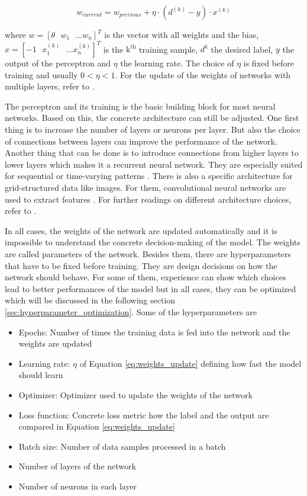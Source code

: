 \begin{equation}
	\label{eq:weights_update}
	w_{current} = w_{previous} + \eta \cdot \left(d^{(k)} - y\right) \cdot x^{(k)}
\end{equation}

where $ w = [\theta \text{ } w_1 \text{ } ... w_n]^T $ is the vector with all weights and the bias, $ x = [-1 \text{ } x_1^{(k)} \text{ } ... x_n^{(k)}]^T $ is the $ \text{k}^{\text{th}} $ training sample, $ d^{k} $ the desired label, $ y $ the output of the perceptron and $ \eta $ the learning rate. The choice of $ \eta $ is fixed before training and usually $ 0 < \eta < 1 $. For the update of the weights of networks with multiple layers, refer to \cite{da2017artificial}. 

The perceptron and its training is the basic building block for most neural networks. Based on this, the concrete architecture can still be adjusted. One first thing is to increase the number of layers or neurons per layer. But also the choice of connections between layers can improve the performance of the network. Another thing that can be done is to introduce connections from higher layers to lower layers which makes it a recurrent neural network. They are especially suited for sequential or time-varying patterns \cite{medsker2001recurrent}. There is also a specific architecture for grid-structured data like images. For them, convolutional neural networks are used to extract features \cite{li2021survey, gu2018recent, o2015introduction}. For further readings on different architecture choices, refer to \cite{liu2017survey}.

In all cases, the weights of the network are updated automatically and it is impossible to understand the concrete decision-making of the model. The weights are called parameters of the network. Besides them, there are hyperparameters that have to be fixed before training. They are design decisions on how the network should behave. For some of them, experience can show which choices lead to better performances of the model but in all cases, they can be optimized which will be discussed in the following section \ref{sec:hyperparameter_optimization}. Some of the hyperparameters are
\begin{itemize}
	\item Epochs: Number of times the training data is fed into the network and the weights are updated
	\item Learning rate: $ \eta $ of Equation \ref{eq:weights_update} defining how fast the model should learn
	\item Optimizer: Optimizer used to update the weights of the network
	\item Loss function: Concrete loss metric how the label and the output are compared in Equation \ref{eq:weights_update}
	\item Batch size: Number of data samples processed in a batch
	\item Number of layers of the network
	\item Number of neurons in each layer
\end{itemize}

